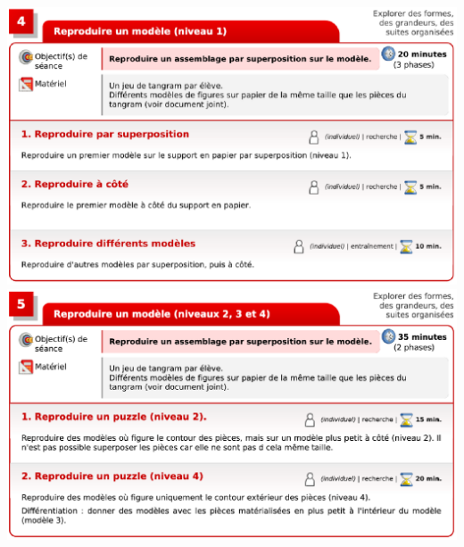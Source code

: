 \begin{exercice*}
\begin{center}
   \includegraphics[width=15cm]{Geometrie_did/Images/Geo5_activite_edumoov7} \\ 
   \includegraphics[width=15cm]{Geometrie_did/Images/Geo5_activite_edumoov8}
\end{center}
\end{exercice*}


